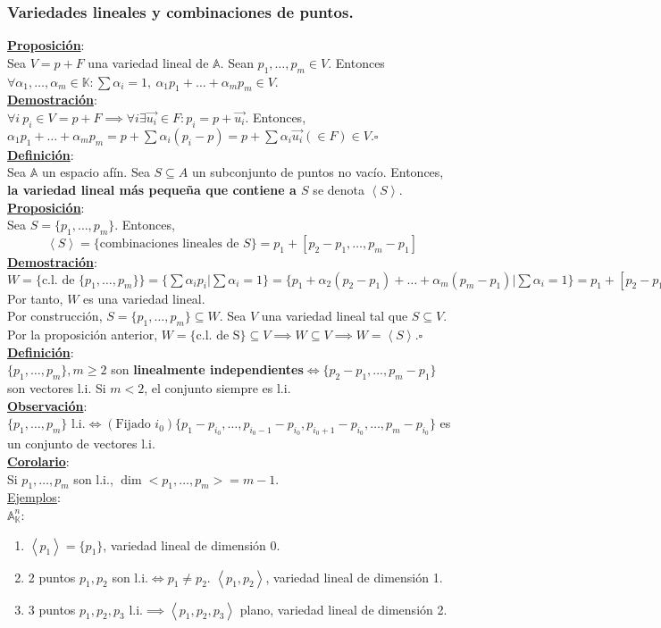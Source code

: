\documentclass[11pt]{article}
\newcommand{\af}{\mathbb{A}}
\newcommand{\defi}{\underline{\textbf{Definición}}:\\}
\newcommand{\prop}{\underline{\textbf{Proposición}}:\\}
\newcommand{\dem}{\underline{\textbf{Demostración}}:\\}
\newcommand{\ej}{\underline{Ejemplos}:\\}
\newcommand{\obs}{\underline{\textbf{Observación}}: }
\newcommand{\cor}{\underline{\textbf{Corolario}}:\\}
\begin{document}
\subsubsection{Variedades lineales y combinaciones de puntos.}
\prop Sea $V=p+F$ una variedad lineal de $\af$. Sean $p_1,\ldots,p_m\in V$. Entonces $\forall\alpha_1,\ldots,\alpha_m\in\mathbb{K}:\sum\alpha_i=1,\ \alpha_1p_1+\ldots+\alpha_mp_m\in V$.\\
\dem $\forall i\ p_i\in V=p+F\implies\forall i\exists\vec{u_i}\in F:p_i=p+\vec{u_i}.$ Entonces, $\alpha_1p_1+\ldots+\alpha_mp_m=p+\sum\alpha_i(p_i-p)=p+\sum\alpha_i\vec{u_i}(\in F)\in V.\square$\\
\defi Sea $\af$ un espacio afín. Sea $S\subseteq A$ un subconjunto de puntos no vacío. Entonces, \textbf{la variedad lineal más pequeña que contiene a $S$} se denota $\left< S\right>$.\\
\prop Sea $S=\{p_1,\ldots,p_m\}$. Entonces,
$$
\left< S\right>=\{\textrm{combinaciones lineales de }S\}=p_1+[p_2-p_1,\ldots,p_m-p_1]
$$
\dem $W=\{\textrm{c.l. de }\{p_1,\ldots,p_m\}\}=\{\sum\alpha_ip_i\vert\sum\alpha_i=1\}=\{p_1+\alpha_2(p_2-p_1)+\ldots+\alpha_m(p_m-p_1)\vert\sum\alpha_i=1\}=p_1+[p_2-p_1,p_3-p_1,\ldots,p_m-p_1].$ Por tanto, $W$ es una variedad lineal.\\
Por construcción, $S=\{p_1,\ldots,p_m\}\subseteq W.$ Sea $V$ una variedad lineal tal que $S\subseteq V$. Por la proposición anterior, $W=\{\textrm{c.l. de S}\}\subseteq V\implies W\subseteq V\implies W=\left<S\right>.\square$\\
\defi $\{p_1,\ldots,p_m\},m\geq 2$ son \textbf{linealmente independientes}$\iff\{p_2-p_1,\ldots,p_m-p_1\}$ son vectores l.i. Si $m<2$, el conjunto siempre es l.i.\\
\obs $\{p_1,\ldots,p_m\}\textrm{ l.i.}\iff(\textrm{Fijado }i_0)\{p_1-p_{i_0},\ldots,p_{i_0-1}-p_{i_0},p_{i_0+1}-p_{i_0},\ldots,p_m-p_{i_0}\}$ es un conjunto de vectores l.i.\\
\cor Si $p_1,\ldots,p_m$ son l.i., $\dim <p_1,\ldots,p_m>=m-1$.\\
\ej $\af^n_{\mathbb{K}}$:
\begin{enumerate}
	\item $\left<p_1\right>=\{p_1\}$, variedad lineal de dimensión 0.
	\item 2 puntos $p_1,p_2$ son l.i.$\iff p_1\neq p_2$. $\left<p_1,p_2\right>$, variedad lineal de dimensión 1.
	\item 3 puntos $p_1,p_2,p_3$ l.i.$\implies\left<p_1,p_2,p_3\right>$ plano, variedad lineal de dimensión 2.
\end{enumerate}
\end{document}
